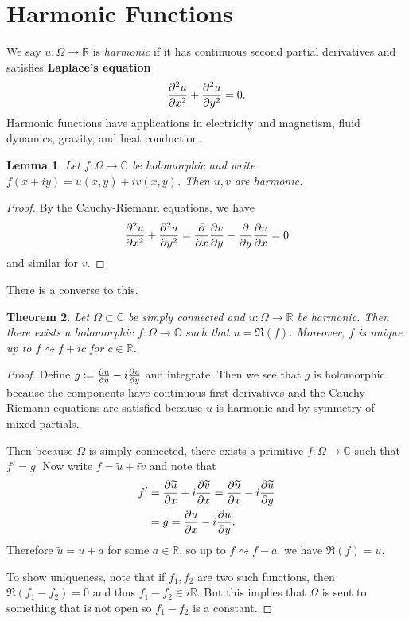 \documentclass[leqno, openany]{memoir}
\newtheorem{thm}{Theorem}[section]
\newtheorem{lem}[thm]{Lemma}
\theoremstyle{definition}
\theoremstyle{remark}
\theoremstyle{plain}
\theoremstyle{definition}
\theoremstyle{remark}
\newcommand{\R}{\mathbb{R}}
\newcommand{\C}{\mathbb{C}}
\newcommand{\wt}[1]{\widetilde{#1}}
\begin{document}
\section{Harmonic Functions}%

We say $u \colon \Omega \to \R$ is \textit{harmonic} if it has continuous
second partial derivatives and satisfies \textbf{Laplace's equation} \[
\pdv[2]{u}{x} + \pdv[2]{u}{y} = 0. \] Harmonic functions have applications in
electricity and magnetism, fluid dynamics, gravity, and heat conduction.

\begin{lem} Let $f \colon \Omega \to \C$ be holomorphic and write $f(x+iy) =
u(x,y) + iv(x,y)$. Then $u,v$ are harmonic.  \end{lem}

\begin{proof} By the Cauchy-Riemann equations, we have \[ \pdv[2]{u}{x} +
\pdv[2]{u}{y} = \pdv{x} \pdv{v}{y} - \pdv{y} \pdv{v}{x} = 0 \] and similar for
$v$.  \end{proof}

There is a converse to this.

\begin{thm} Let $\Omega \subset \C$ be simply connected and $u \colon \Omega
    \to \R$ be harmonic. Then there exists a holomorphic $f \colon \Omega \to
    \C$ such that $u = \Re(f)$. Moreover, $f$ is unique up to $f
    \rightsquigarrow f + ic$ for $c \in \R$.  \end{thm}

\begin{proof} Define $g \coloneqq \pdv{u}{u} - i \pdv{u}{y}$ and integrate.
    Then we see that $g$ is holomorphic because the components have continuous
    first derivatives and the Cauchy-Riemann equations are satisfied because
    $u$ is harmonic and by symmetry of mixed partials.

    Then because $\Omega$ is simply connected, there exists a primitive $f
    \colon \Omega \to \C$ such that $f' = g$. Now write $f = \wt{u} + i \wt{v}$
    and note that \begin{align*} f' &= \pdv{\wt{u}}{x} + i \pdv{\wt{v}}{x} =
        \pdv{\wt{u}}{x} - i \pdv{\wt{u}}{y} \\ &= g = \pdv{u}{x} - i
    \pdv{u}{y}.  \end{align*} Therefore $\wt{u} = u + a$ for some $a \in \R$,
    so up to $f \rightsquigarrow f - a$, we have $\Re(f) = u$.

    To show uniqueness, note that if $f_1, f_2$ are two such functions, then
$\Re(f_1 - f_2) = 0$ and thus $f_1 - f_2 \in i\R$. But this implies that
$\Omega$ is sent to something that is not open so $f_1 - f_2$ is a constant.
    \end{proof}
\end{document}
